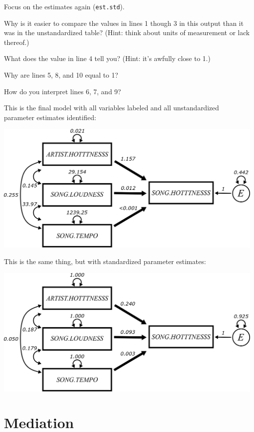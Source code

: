 \documentclass[
]{book}
\begin{document}
Focus on the estimates again (\texttt{est.std}).

Why is it easier to compare the values in lines 1 though 3 in this output than it was in the unstandardized table? (Hint: think about units of measurement or lack thereof.)

What does the value in line 4 tell you? (Hint: it's awfully close to 1.)

Why are lines 5, 8, and 10 equal to 1?

How do you interpret lines 6, 7, and 9?

This is the final model with all variables labeled and all unstandardized parameter estimates identified:

\begin{center}\includegraphics{graphics/multiple_regression_music} \end{center}

This is the same thing, but with standardized parameter estimates:

\begin{center}\includegraphics{graphics/multiple_regression_music_std} \end{center}

\hypertarget{mediation}{%
\chapter{Mediation}\label{mediation}}
\end{document}

